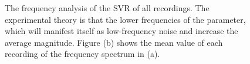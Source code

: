 \begin{figure}[h]
  \centering
      \hfill
  \caption{The frequency analysis of the SVR of all recordings. The experimental theory is that the lower frequencies of the parameter, which will manifest itself as low-frequency noise and increase the average magnitude. Figure (b) shows the mean value of each recording of the frequency spectrum in (a).}
  \label{fig:resistance_dft}
\end{figure}


